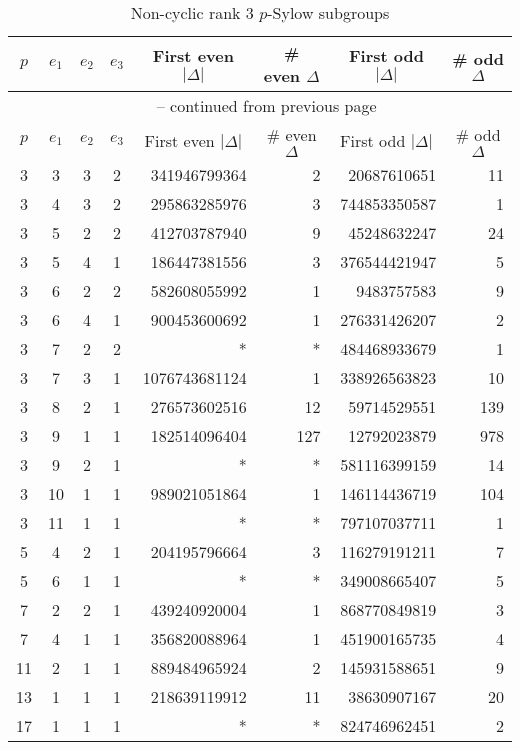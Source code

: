 \documentclass{mcom-l}
\theoremstyle{definition}
\begin{document}
\begin{longtable}[c]{| c | c | c | c || r | r | r | r |}
\caption{Non-cyclic rank 3 $p$-Sylow subgroups\label{tab:NC_3_p}}\\

\hline
$p$ & $e_1$	& $e_2$	& $e_3$	& \multicolumn{1}{c|}{First even $|\Delta|$}	& \multicolumn{1}{c|}{\# even $\Delta$}	& \multicolumn{1}{c|}{First odd $|\Delta|$}	& \multicolumn{1}{c|}{\# odd $\Delta$}\\
\hline
\hline
\endfirsthead

\multicolumn{8}{c}{\normalsize{{\tablename~\thetable{}} -- continued from previous page}} \\
\hline
$p$ & $e_1$	& $e_2$	& $e_3$	& \multicolumn{1}{c|}{First even $|\Delta|$}	& \multicolumn{1}{c|}{\# even $\Delta$}	& \multicolumn{1}{c|}{First odd $|\Delta|$}	& \multicolumn{1}{c|}{\# odd $\Delta$}\\
\hline
\hline
\endhead

\hline
\endfoot

\hline
\endlastfoot

3	& 3	& 3	& 2	& 341946799364	& 2	& 20687610651	& 11\\
\hline
3	& 4	& 3	& 2	& 295863285976	& 3	& 744853350587	& 1\\
\hline
3	& 5	& 2	& 2	& 412703787940	& 9	& 45248632247	& 24\\
\hline
3	& 5	& 4	& 1	& 186447381556	& 3	& 376544421947	& 5\\
\hline
3	& 6	& 2	& 2	& 582608055992	& 1	& 9483757583	& 9\\
\hline
3	& 6	& 4	& 1	& 900453600692	& 1	& 276331426207	& 2\\
\hline
3	& 7	& 2	& 2	& *	& *	& 484468933679	& 1\\
\hline
3	& 7	& 3	& 1	& 1076743681124	& 1	& 338926563823	& 10\\
\hline
3	& 8	& 2	& 1	& 276573602516	& 12	& 59714529551	& 139\\
\hline
3	& 9	& 1	& 1	& 182514096404	& 127	& 12792023879	& 978\\
\hline
3	& 9	& 2	& 1	& *	& *	& 581116399159	& 14\\
\hline
3	& 10	& 1	& 1	& 989021051864	& 1	& 146114436719	& 104\\
\hline
3	& 11	& 1	& 1	& *	& *	& 797107037711	& 1\\
\hline
5	& 4	& 2	& 1	& 204195796664	& 3	& 116279191211	& 7\\
\hline
5	& 6	& 1	& 1	& *	& *	& 349008665407	& 5\\
\hline
7	& 2	& 2	& 1	& 439240920004	& 1	& 868770849819	& 3\\
\hline
7	& 4	& 1	& 1	& 356820088964	& 1	& 451900165735	& 4\\
\hline
11	& 2	& 1	& 1	& 889484965924	& 2	& 145931588651	& 9\\
\hline
13	& 1	& 1	& 1	& 218639119912	& 11	& 38630907167	& 20\\
\hline
17	& 1	& 1	& 1	& *	& *	& 824746962451	& 2\\
\end{longtable}
\end{document}
